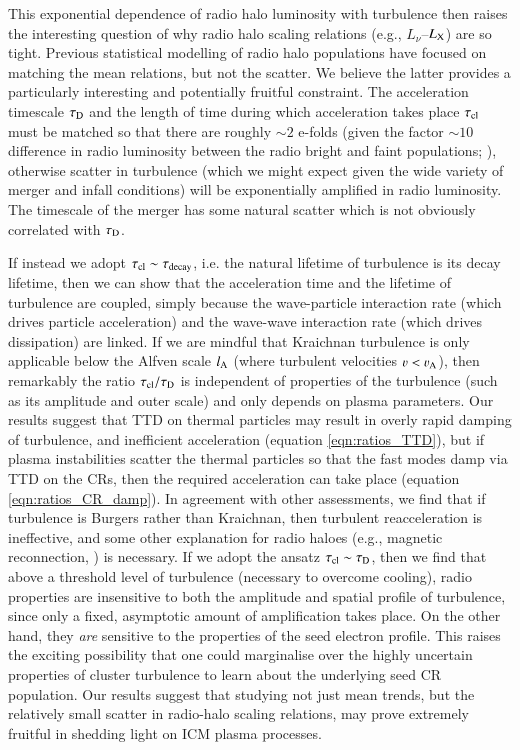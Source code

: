 \documentclass[fleqn,usenatbib,useAMS]{mnras}
\begin{document}
This exponential dependence of radio halo luminosity with turbulence then raises
the interesting question of why radio halo scaling relations (e.g.,
$L_{\nu}$--$L_{\rm X}$) are so tight. Previous statistical modelling of radio
halo populations \citep{2006MNRAS.369.1577C,2007MNRAS.378.1565C} have focused
on matching the mean relations, but not the scatter. We believe the latter
provides a particularly interesting and potentially fruitful constraint. The
acceleration timescale $\tau_{\rm D}$ and the length of time during which
acceleration takes place $\tau_{\rm cl}$ must be matched so that there are
roughly $\sim 2$ e-folds (given the factor $\sim 10$ difference in radio
luminosity between the radio bright and faint populations; \citet{brown11}),
otherwise scatter in turbulence (which we might expect given the wide variety of
merger and infall conditions) will be exponentially amplified in radio
luminosity. The timescale of the merger has some natural scatter which is not
obviously correlated with $\tau_{\rm D}$. 

If instead we adopt $\tau_{\rm cl} \sim \tau_{\rm decay}$, i.e. the natural
lifetime of turbulence is its decay lifetime, then we can show that the
acceleration time and the lifetime of turbulence are coupled, simply because the
wave-particle interaction rate (which drives particle acceleration) and the
wave-wave interaction rate (which drives dissipation) are linked. If we are
mindful that Kraichnan turbulence is only applicable below the Alfven scale
$l_{\rm A}$ (where turbulent velocities $\varv < \varv_{\rm A}$), then remarkably the
ratio $\tau_{\rm cl}/\tau_{\rm D}$ is independent of properties of the
turbulence (such as its amplitude and outer scale) and only depends on plasma
parameters. Our results suggest that TTD on thermal particles may result in
overly rapid damping of turbulence, and inefficient acceleration (equation
\ref{eqn:ratios_TTD}), but if plasma instabilities scatter the thermal particles
so that the fast modes damp via TTD on the CRs, then the required
acceleration can take place (equation \ref{eqn:ratios_CR_damp}). In agreement
with other assessments, we find that if turbulence is Burgers rather than
Kraichnan, then turbulent reacceleration is ineffective, and some other
explanation for radio haloes (e.g., magnetic reconnection, \citealt{brunetti16}) is
necessary. If we adopt the ansatz $\tau_{\rm cl} \sim \tau_{\rm D}$, then we
find that above a threshold level of turbulence (necessary to overcome cooling),
radio properties are insensitive to both the amplitude and spatial profile of
turbulence, since only a fixed, asymptotic amount of amplification takes
place. On the other hand, they {\it are} sensitive to the properties of the seed
electron profile. This raises the exciting possibility that one could
marginalise over the highly uncertain properties of cluster turbulence to learn
about the underlying seed CR population. Our results suggest that studying not
just mean trends, but the relatively small scatter in radio-halo scaling
relations, may prove extremely fruitful in shedding light on ICM plasma
processes.
\end{document}

